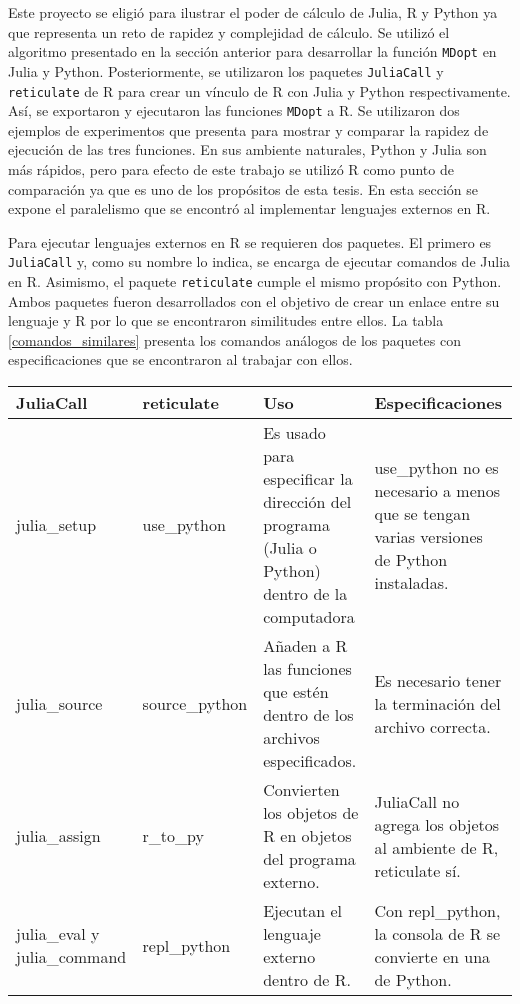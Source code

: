 Este proyecto se eligió para ilustrar el poder de cálculo de \textsf{Julia, R} y \textsf{Python} ya que representa un reto de rapidez y complejidad de cálculo. Se utilizó el algoritmo presentado en la sección anterior para desarrollar la función \texttt{MDopt} en \textsf{Julia} y \textsf{Python}. Posteriormente, se utilizaron los paquetes \texttt{JuliaCall} y \texttt{reticulate} de \textsf{R} para crear un vínculo de \textsf{R} con \textsf{Julia} y \textsf{Python} respectivamente. Así, se exportaron y ejecutaron las funciones \texttt{MDopt} a \textsf{R}. Se utilizaron dos ejemplos de experimentos que presenta \cite{meyer1996} para mostrar y comparar la rapidez de ejecución de las tres funciones. En sus ambiente naturales, \textsf{Python} y \textsf{Julia} son más rápidos, pero para efecto de este trabajo se utilizó \textsf{R} como punto de comparación ya que es uno de los propósitos de esta tesis. En esta sección se expone el paralelismo que se encontró al implementar lenguajes externos en \textsf{R}.

Para ejecutar lenguajes externos en \textsf{R} se requieren dos paquetes. El primero es \texttt{JuliaCall} y, como su nombre lo indica, se encarga de ejecutar comandos de \textsf{Julia} en \textsf{R}. Asimismo, el paquete \texttt{reticulate} cumple el mismo propósito con \textsf{Python}. Ambos paquetes fueron desarrollados con el objetivo de crear un enlace entre su lenguaje y \textsf{R} por lo que se encontraron similitudes entre ellos. La tabla \ref{comandos_similares} presenta los comandos análogos de los paquetes con especificaciones que se encontraron al trabajar con ellos. 

\begin{center}
	\begin{tabular}{ |p{2.5cm}|p{2.5cm}|p{3cm}|p{3cm}|  }
		\hline
		JuliaCall & reticulate & Uso & Especificaciones\\
		\hline
		julia\_setup   & use\_python    & Es usado para especificar la dirección del programa (Julia o Python) dentro de la computadora &   use\_python no es necesario a menos que se tengan varias versiones de Python instaladas.\\
		\hline
		julia\_source &   source\_python  & Añaden a R las funciones que estén dentro de los archivos especificados.   & Es necesario tener la terminación del archivo correcta.\\
		\hline
		julia\_assign & r\_to\_py &  Convierten los objetos de R en objetos del programa externo. &  JuliaCall no agrega los objetos al ambiente de R, reticulate sí.\\
		\hline
		julia\_eval y julia\_command  & repl\_python\(\) & Ejecutan el lenguaje externo dentro de R. &  Con repl\_python, la consola de R se convierte en una de Python.\\
		\hline
	\end{tabular}
	 \label{comandos_similares}
\end{center}


